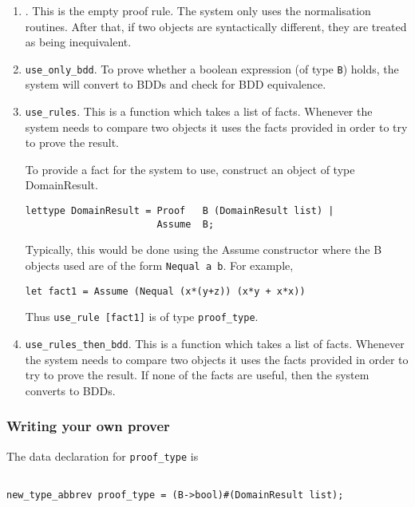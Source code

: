 \begin{enumerate}
\item {\tt <::>}. This is the empty proof rule.  The system
only uses the normalisation routines. After that, if two objects
are syntactically different, they are treated as being inequivalent.

\item {\tt use\_only\_bdd}. To prove whether a boolean expression
(of type {\tt B}) holds, the system will convert to BDDs and
check for BDD equivalence.

\item {\tt use\_rules}. This is a function which takes a list
of facts. Whenever the system needs to compare two objects
it uses the facts provided in order to try to prove the
result.

To provide a fact for the system to use, construct an object
of type DomainResult. 

\begin{verbatim}
lettype DomainResult = Proof   B (DomainResult list) | 
                       Assume  B;
\end{verbatim}

Typically, this would be done using the Assume constructor
where the B objects used are of the form {\tt Nequal a b}.
For example,

\begin{verbatim}
let fact1 = Assume (Nequal (x*(y+z)) (x*y + x*x))
\end{verbatim}

Thus {\tt use\_rule [fact1]} is of type {\tt proof\_type}.


\item {\tt use\_rules\_then\_bdd}.  This is a function which takes a list
of facts. Whenever the system needs to compare two objects
it uses the facts provided in order to try to prove the
result. If none of the facts are useful, then the system
converts to BDDs.

\end{enumerate}

\subsubsection*{Writing your own prover}

The data declaration for {\tt proof\_type} is

\begin{verbatim}

new_type_abbrev proof_type = (B->bool)#(DomainResult list);

\end{verbatim}

